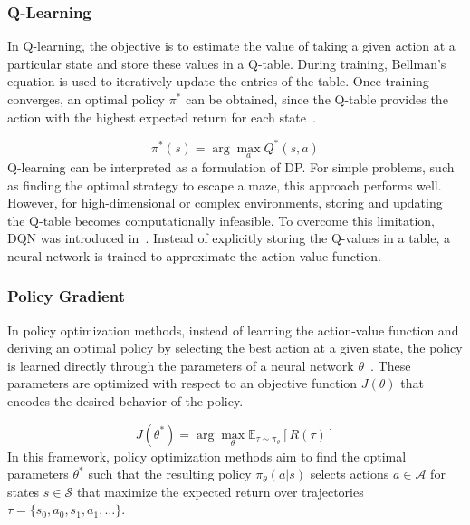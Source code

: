 \subsubsection{Q-Learning}

In Q-learning, the objective is to estimate the value of taking a given action at a particular state and store these values in a Q-table.
During training, Bellman’s equation is used to iteratively update the entries of the table.
Once training converges, an optimal policy $\pi^*$ can be obtained, since the Q-table provides the action with the highest expected return for each state~\cite{Sutton1998}.

\begin{equation}
    \pi^*(s) = \arg\max_a Q^*(s,a)
\end{equation}
Q-learning can be interpreted as a formulation of \ac{DP}.
For simple problems, such as finding the optimal strategy to escape a maze, this approach performs well.
However, for high-dimensional or complex environments, storing and updating the Q-table becomes computationally infeasible.
To overcome this limitation, \ac{DQN} was introduced in~\cite{mnih_playing_nodate}.
Instead of explicitly storing the Q-values in a table, a neural network is trained to approximate the action-value function.


\subsubsection{Policy Gradient}
In policy optimization methods, instead of learning the action-value function and deriving an optimal policy by selecting the best action at a given state, the policy is learned directly through the parameters of a neural network $\theta$~\cite{Sutton1998}.
These parameters are optimized with respect to an objective function $J(\theta)$ that encodes the desired behavior of the policy.

\begin{equation}\label{opt_theta}
    J(\theta^*) = \arg \max_{\theta} \mathbb{E}_{\tau \sim \pi_\theta} \left[ R(\tau) \right]
\end{equation}
In this framework, policy optimization methods aim to find the optimal parameters $\theta^*$ such that the resulting policy $\pi_{\theta}(a|s)$ selects actions $a \in \mathcal{A}$ for states $s \in \mathcal{S}$ that maximize the expected return over trajectories $\tau = \{s_0, a_0, s_1, a_1, \dots\}$.

